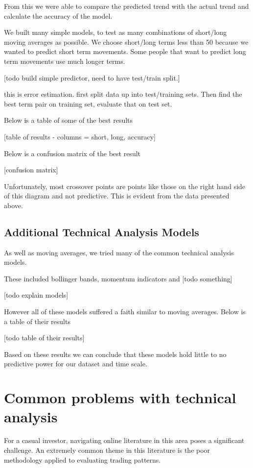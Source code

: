 \documentclass{report}
\begin{document}
From this we were able to compare the predicted trend with the actual trend and calculate the accuracy of the model. 

We built many simple models, to test as many combinations of short/long moving averages as possible. We choose short/long terms less than 50 because we wanted to predict short term movements. Some people that want to predict long term movements use much longer terms.

[todo build simple predictor, need to have test/train split.]

this is error estimation. first split data up into test/training sets. Then find the best term pair on training set, evaluate that on test set.

Below is a table of some of the best results

[table of results - columns = short, long, accuracy]

Below is a confusion matrix of the best result

[confusion matrix] 

Unfortunately, most crossover points are points like those on the right hand side of this diagram and not predictive. This is evident from the data presented above.

\subsection{Additional Technical Analysis Models }

As well as moving averages, we tried many of the common technical analysis models.

These included bollinger bands, momentum indicators and [todo something]

[todo explain models]

However all of these models suffered a faith similar to moving averages. Below is a table of their results

[todo table of their results]

Based on these results we can conclude that these models hold little to no predictive power for our dataset and time scale.

\section{Common problems with technical analysis}

For a casual investor, navigating online literature in this area poses a significant challenge. An extremely common theme in this literature is the poor methodology applied to evaluating trading patterns.
\end{document}

